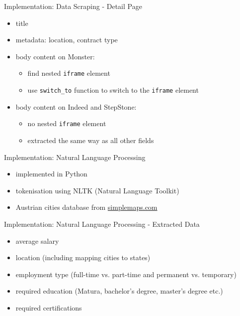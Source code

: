 \documentclass[aspectratio=169]{beamer}
\begin{document}
  \begin{frame}{Implementation: Data Scraping - Detail Page}
    \begin{itemize}
      \item title
      \item metadata: location, contract type
      \item body content on Monster:
        \begin{itemize}
          \item find nested \texttt{iframe} element
          \item use \texttt{switch\_to} function to switch to the \texttt{iframe} element
        \end{itemize}
      \item body content on Indeed and StepStone:
        \begin{itemize}
          \item no nested \texttt{iframe} element
          \item extracted the same way as all other fields
        \end{itemize}
    \end{itemize}
  \end{frame}

  \begin{frame}{Implementation: Natural Language Processing}
    \begin{itemize}
      \item implemented in Python
      \item tokenisation using NLTK (Natural Language Toolkit)
      \item Austrian cities database from \href{https://simplemaps.com}{simplemaps.com}
    \end{itemize}
  \end{frame}

  \begin{frame}{Implementation: Natural Language Processing - Extracted Data}
    \begin{itemize}
      \item average salary
      \item location (including mapping cities to states)
      \item employment type (full-time vs. part-time and permanent vs. temporary)
      \item required education (Matura, bachelor's degree, master's degree etc.)
      \item required certifications
    \end{itemize}
  \end{frame}
\end{document}
